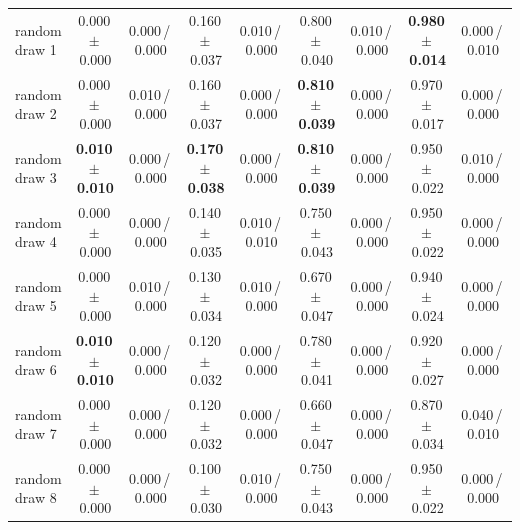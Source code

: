 \begin{tabular}{@{}lcccccccc@{}}
\midrule
random draw 1 & 0.000\,{\scriptsize$\pm$\,0.000} & {\scriptsize 0.000\,/\,0.000} & 0.160\,{\scriptsize$\pm$\,0.037} & {\scriptsize 0.010\,/\,0.000} & 0.800\,{\scriptsize$\pm$\,0.040} & {\scriptsize 0.010\,/\,0.000} & \textbf{0.980\,{\scriptsize$\pm$\,0.014}} & {\scriptsize 0.000\,/\,0.010} \\
random draw 2 & 0.000\,{\scriptsize$\pm$\,0.000} & {\scriptsize 0.010\,/\,0.000} & 0.160\,{\scriptsize$\pm$\,0.037} & {\scriptsize 0.000\,/\,0.000} & \textbf{0.810\,{\scriptsize$\pm$\,0.039}} & {\scriptsize 0.000\,/\,0.000} & 0.970\,{\scriptsize$\pm$\,0.017} & {\scriptsize 0.000\,/\,0.000} \\
random draw 3 & \textbf{0.010\,{\scriptsize$\pm$\,0.010}} & {\scriptsize 0.000\,/\,0.000} & \textbf{0.170\,{\scriptsize$\pm$\,0.038}} & {\scriptsize 0.000\,/\,0.000} & \textbf{0.810\,{\scriptsize$\pm$\,0.039}} & {\scriptsize 0.000\,/\,0.000} & 0.950\,{\scriptsize$\pm$\,0.022} & {\scriptsize 0.010\,/\,0.000} \\
random draw 4 & 0.000\,{\scriptsize$\pm$\,0.000} & {\scriptsize 0.000\,/\,0.000} & 0.140\,{\scriptsize$\pm$\,0.035} & {\scriptsize 0.010\,/\,0.010} & 0.750\,{\scriptsize$\pm$\,0.043} & {\scriptsize 0.000\,/\,0.000} & 0.950\,{\scriptsize$\pm$\,0.022} & {\scriptsize 0.000\,/\,0.000} \\
\midrule
random draw 5 & 0.000\,{\scriptsize$\pm$\,0.000} & {\scriptsize 0.010\,/\,0.000} & 0.130\,{\scriptsize$\pm$\,0.034} & {\scriptsize 0.010\,/\,0.000} & 0.670\,{\scriptsize$\pm$\,0.047} & {\scriptsize 0.000\,/\,0.000} & 0.940\,{\scriptsize$\pm$\,0.024} & {\scriptsize 0.000\,/\,0.000} \\
random draw 6 & \textbf{0.010\,{\scriptsize$\pm$\,0.010}} & {\scriptsize 0.000\,/\,0.000} & 0.120\,{\scriptsize$\pm$\,0.032} & {\scriptsize 0.000\,/\,0.000} & 0.780\,{\scriptsize$\pm$\,0.041} & {\scriptsize 0.000\,/\,0.000} & 0.920\,{\scriptsize$\pm$\,0.027} & {\scriptsize 0.000\,/\,0.000} \\
random draw 7 & 0.000\,{\scriptsize$\pm$\,0.000} & {\scriptsize 0.000\,/\,0.000} & 0.120\,{\scriptsize$\pm$\,0.032} & {\scriptsize 0.000\,/\,0.000} & 0.660\,{\scriptsize$\pm$\,0.047} & {\scriptsize 0.000\,/\,0.000} & 0.870\,{\scriptsize$\pm$\,0.034} & {\scriptsize 0.040\,/\,0.010} \\
random draw 8 & 0.000\,{\scriptsize$\pm$\,0.000} & {\scriptsize 0.000\,/\,0.000} & 0.100\,{\scriptsize$\pm$\,0.030} & {\scriptsize 0.010\,/\,0.000} & 0.750\,{\scriptsize$\pm$\,0.043} & {\scriptsize 0.000\,/\,0.000} & 0.950\,{\scriptsize$\pm$\,0.022} & {\scriptsize 0.000\,/\,0.000} \\

\end{tabular}
